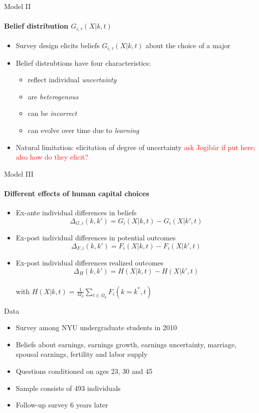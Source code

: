 \documentclass[12pt]{beamer}
\begin{document}
\begin{frame}{Model II}
    \framesubtitle{Belief distribution $G_{i,\tau}(X|k,t)$}
    \begin{itemize}
        \item Survey design elicits beliefs $G_{i,\tau}(X|k,t)$ about the choice of a major
        \item Belief distrubtions have four characteristics:
        \begin{itemize}
            \item reflect individual \textit{uncertainty}
            \item are \textit{heterogenous}
            \item can be \textit{incorrect}
            \item can evolve over time due to \textit{learning}
        \end{itemize}
        \item Natural limitation: elicitation of degree of uncertainty \textcolor{red}{ask Jogibär if put here; also how do they elicit?}
    \end{itemize}
\end{frame}

\begin{frame}{Model III}
    \framesubtitle{Different effects of human capital choices}
    \begin{itemize}
        \item Ex-ante individual differences in beliefs
        $$ \Delta_{G,i}(k,k') = G_i(X|k,t) - G_i(X|k',t) $$
        \item Ex-post individual differences in potential outcomes
        $$ \Delta_{F,i}(k,k') = F_i(X|k,t) - F_i(X|k',t) $$
        \item Ex-post individual differences realized outcomes
        $$ \Delta_{H}(k,k') = H(X|k,t) - H(X|k',t) $$ \\
        with $H(X|k,t) = \frac{1}{M_k} \sum_{t \in \Omega_k} F_i(k = k^*,t)$
    \end{itemize}
    
\end{frame}

\begin{frame}{Data}
    \begin{itemize}
        \item Survey among NYU undergraduate students in 2010
        \item Beliefs about earnings, earnings growth, earnings uncertainty, marriage, spousal earnings, fertility and labor supply
        \item Questions conditioned on ages 23, 30 and 45
        \item Sample consists of 493 individuals
        \item Follow-up survey 6 years later
    \end{itemize}
\end{frame}
\end{document}
